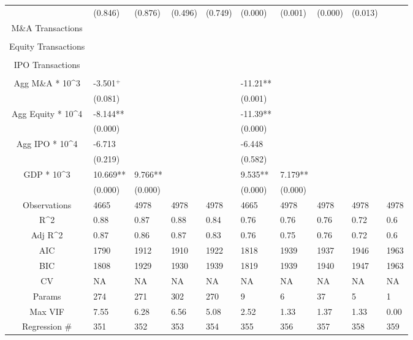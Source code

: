 \documentclass{article}
\begin{document}
\begin{table}[H]
\begin{tabular}{|clllllllll|}
   & (0.846) & (0.876) & (0.496) & (0.749) & (0.000) & (0.001) & (0.000) & (0.013) &  \\
  M\&A Transactions &  &  &  &  &  &  &  &  &  \\
   &  &  &  &  &  &  &  &  &  \\
  Equity Transactions &  &  &  &  &  &  &  &  &  \\
   &  &  &  &  &  &  &  &  &  \\
  IPO Transactions &  &  &  &  &  &  &  &  &  \\
   &  &  &  &  &  &  &  &  &  \\
  Agg M\&A * 10^3 & -3.501$^{+}$ &  &  &  & -11.21** &  &  &  &  \\
   & (0.081) &  &  &  & (0.001) &  &  &  &  \\
  Agg Equity * 10^4 & -8.144** &  &  &  & -11.39** &  &  &  &  \\
   & (0.000) &  &  &  & (0.000) &  &  &  &  \\
  Agg IPO * 10^4 & -6.713 &  &  &  & -6.448 &  &  &  &  \\
   & (0.219) &  &  &  & (0.582) &  &  &  &  \\
  GDP * 10^3 & 10.669** & 9.766** &  &  & 9.535** & 7.179** &  &  &  \\
   & (0.000) & (0.000) &  &  & (0.000) & (0.000) &  &  &  \\
  \hline
 Observations & 4665 & 4978 & 4978 & 4978 & 4665 & 4978 & 4978 & 4978 & 4978 \\
  R^2 & 0.88 & 0.87 & 0.88 & 0.84 & 0.76 & 0.76 & 0.76 & 0.72 & 0.6 \\
  Adj R^2 & 0.87 & 0.86 & 0.87 & 0.83 & 0.76 & 0.75 & 0.76 & 0.72 & 0.6 \\
  AIC & 1790 & 1912 & 1910 & 1922 & 1818 & 1939 & 1937 & 1946 & 1963 \\
  BIC & 1808 & 1929 & 1930 & 1939 & 1819 & 1939 & 1940 & 1947 & 1963 \\
  CV & NA & NA & NA & NA & NA & NA & NA & NA & NA \\
  Params & 274 & 271 & 302 & 270 & 9 & 6 & 37 & 5 & 1 \\
  Max VIF & 7.55 & 6.28 & 6.56 & 5.08 & 2.52 & 1.33 & 1.37 & 1.33 & 0.00 \\
  Regression \# & 351 & 352 & 353 & 354 & 355 & 356 & 357 & 358 & 359 \\
   \hline
\end{tabular}

\end{table}
\end{document}
